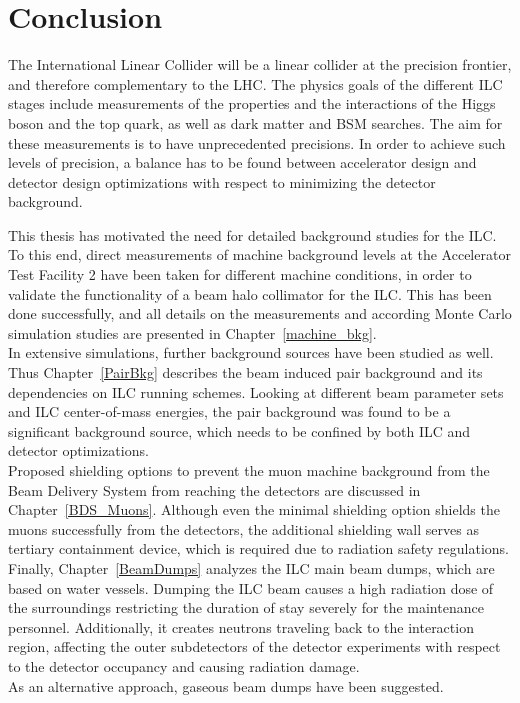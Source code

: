 \chapter{Conclusion}
\label{Conclusion}
The International Linear Collider will be a linear \positron\electron collider at the precision frontier, and therefore complementary to the LHC.
The physics goals of the different ILC stages include measurements of the properties and the interactions of the Higgs boson and the top quark, as well as dark matter and BSM searches.
The aim for these measurements is to have unprecedented precisions.
In order to achieve such levels of precision, a balance has to be found between accelerator design and detector design optimizations with respect to minimizing the detector background.

This thesis has motivated the need for detailed background studies for the ILC.
To this end, direct measurements of machine background levels at the Accelerator Test Facility 2 have been taken for different machine conditions, in order to validate the functionality of a beam halo collimator for the ILC.
This has been done successfully, and all details on the measurements and according Monte Carlo simulation studies are presented in Chapter~\ref{machine_bkg}.
\\In extensive simulations, further background sources have been studied as well.
Thus Chapter~\ref{PairBkg} describes the beam induced \positron\electron pair background and its dependencies on ILC running schemes.
Looking at different beam parameter sets and ILC center-of-mass energies, the pair background was found to be a significant background source, which needs to be confined by both ILC and detector optimizations.
\\Proposed shielding options to prevent the muon machine background from the Beam Delivery System from reaching the detectors are discussed in Chapter~\ref{BDS_Muons}.
Although even the minimal shielding option shields the muons successfully from the detectors, the additional shielding wall serves as tertiary containment device, which is required due to radiation safety regulations.
\\Finally, Chapter~\ref{BeamDumps} analyzes the ILC main beam dumps, which are based on water vessels.
Dumping the ILC beam causes a high radiation dose of the surroundings restricting the duration of stay severely for the maintenance personnel.
Additionally, it creates neutrons traveling back to the interaction region, affecting the outer subdetectors of the detector experiments with respect to the detector occupancy and causing radiation damage.
\\As an alternative approach, gaseous beam dumps have been suggested.

